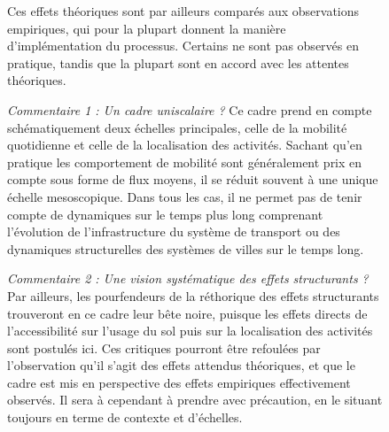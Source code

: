 \begin{figure}[h!]
\begin{mdframed}
		Ces effets théoriques sont par ailleurs comparés aux observations empiriques, qui pour la plupart donnent la manière d'implémentation du processus. Certains ne sont pas observés en pratique, tandis que la plupart sont en accord avec les attentes théoriques.
		
		\bigskip
		
		\textit{Commentaire 1 : Un cadre uniscalaire ?} Ce cadre prend en compte schématiquement deux échelles principales, celle de la mobilité quotidienne et celle de la localisation des activités. Sachant qu'en pratique les comportement de mobilité sont généralement prix en compte sous forme de flux moyens, il se réduit souvent à une unique échelle mesoscopique. Dans tous les cas, il ne permet pas de tenir compte de dynamiques sur le temps plus long comprenant l'évolution de l'infrastructure du système de transport ou des dynamiques structurelles des systèmes de villes sur le temps long.
		
		\bigskip
		
		\textit{Commentaire 2 : Une vision systématique des effets structurants ?} Par ailleurs, les pourfendeurs de la réthorique des effets structurants trouveront en ce cadre leur bête noire, puisque les effets directs de l'accessibilité sur l'usage du sol puis sur la localisation des activités sont postulés ici. Ces critiques pourront être refoulées par l'observation qu'il s'agit des effets attendus théoriques, et que le cadre est mis en perspective des effets empiriques effectivement observés. Il sera à cependant à prendre avec précaution, en le situant toujours en terme de contexte et d'échelles.
		
		\bigskip
		
	\end{mdframed}
\end{figure}



